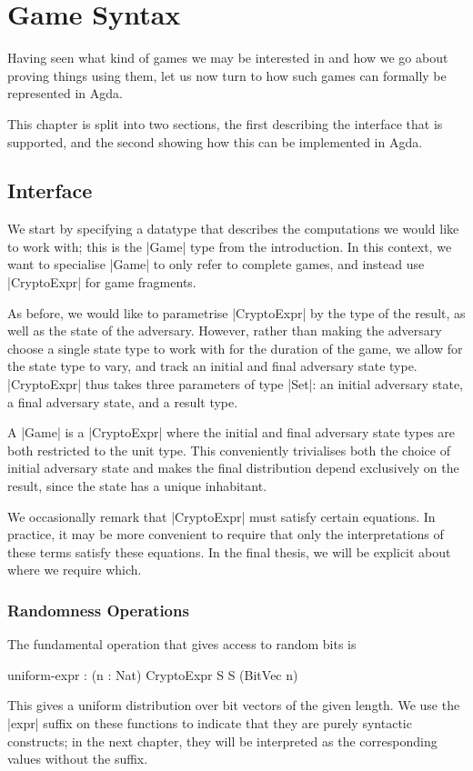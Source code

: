 \chapter{Game Syntax}

Having seen what kind of games we may be interested in and how we go about proving things using them, let us now turn to
how such games can formally be represented in Agda.

This chapter is split into two sections, the first describing the interface that is supported, and the second
showing how this can be implemented in Agda.

\section{Interface}

We start by specifying a datatype that describes the computations we would like to work with; this is the |Game| type
from the introduction.  In this context, we want to specialise |Game| to only refer to complete games, and instead use
|CryptoExpr| for game fragments.

As before, we would like to parametrise |CryptoExpr| by the type of the result, as well as the state of the adversary.
However, rather than making the adversary choose a single state type to work with for the duration of the game, we allow
for the state type to vary, and track an initial and final adversary state type.  |CryptoExpr| thus takes three
parameters of type |Set|: an initial adversary state, a final adversary state, and a result type.

A |Game| is a |CryptoExpr| where the initial and final adversary state types are both restricted to the unit type.  This
conveniently trivialises both the choice of initial adversary state and makes the final distribution depend exclusively
on the result, since the state has a unique inhabitant.

We occasionally remark that |CryptoExpr| must satisfy certain equations.  In practice, it may be more convenient to
require that only the interpretations of these terms satisfy these equations.  In the final thesis, we will be explicit
about where we require which.

\subsection{Randomness Operations}

The fundamental operation that gives access to random bits is
\begin{code}
    uniform-expr :  (n : Nat) \to CryptoExpr S S (BitVec n)
\end{code}
This gives a uniform distribution over bit vectors of the given length.  We use the |expr| suffix on these functions to
indicate that they are purely syntactic constructs; in the next chapter, they will be interpreted as the corresponding
values without the suffix.

